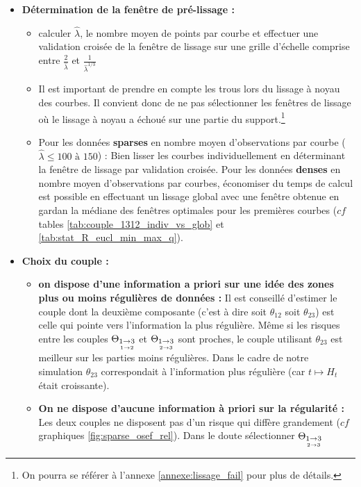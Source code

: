 \begin{itemize}
	\item \textbf{Détermination de la fenêtre de pré-lissage :}
	\begin{itemize}
		
		\item calculer $\widehat \lambda$, le nombre moyen de points par courbe et effectuer une validation croisée de la fenêtre de lissage sur une grille d'échelle comprise entre $\displaystyle\frac{2}{\widehat \lambda}$ et $\displaystyle\frac{1}{\widehat \lambda^{1/3}}$

		\item Il est important de prendre en compte les \og trous \fg lors du lissage à noyau des courbes. Il convient donc de ne pas sélectionner les fenêtres de lissage où le lissage à noyau a échoué sur une partie du support.\footnote{On pourra se référer à l'annexe \ref{annexe:lissage_fail} pour plus de détails.}

		\item Pour les données \textbf{\og sparses \fg} en nombre moyen d'observations par courbe ($\widehat \lambda \leq  100 \textsf{ à } 150$) : Bien lisser les courbes individuellement en déterminant la fenêtre de lissage par validation croisée. Pour les données \textbf{\og denses \fg} en nombre moyen d'observations par courbes, économiser du temps de calcul est possible en effectuant un lissage global avec une fenêtre obtenue en gardan la médiane des fenêtres optimales pour les premières courbes ($cf$ tables \ref{tab:couple_1312_indiv_vs_glob} et \ref{tab:stat_R_eucl_min_max_q}).
	\end{itemize}


	\bigskip

	\item \textbf{Choix du couple :}

	\begin{itemize}
		\item \textbf{on dispose d'une information a priori sur une idée des zones plus ou moins régulières de données :} Il est conseillé d'estimer le couple dont la deuxième composante (c'est à dire soit $\theta_{12}$ soit $\theta_{23}$) est celle qui pointe vers l'information la plus régulière. Même si les risques entre les couples $\Theta_{\underset{1 \rightarrow 2}{1 \rightarrow 3}}$ et $\Theta_{\underset{2 \rightarrow 3}{1 \rightarrow 3}}$ sont proches, le couple utilisant $\theta_{23}$ est meilleur sur les parties moins régulières. Dans le cadre de notre simulation $\theta_{23}$ correspondait à l'information plus régulière (car $t \mapsto H_t$ était croissante).
		\item \textbf{On ne dispose d'aucune information à priori sur la régularité :} Les deux couples ne disposent pas d'un risque qui diffère grandement ($cf$ graphiques \ref{fig:sparse_osef_rel}). Dans le doute sélectionner $\Theta_{\underset{2 \rightarrow 3}{1 \rightarrow 3}}$
	\end{itemize}


\end{itemize}
